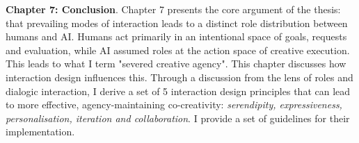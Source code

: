 \textbf{Chapter 7: Conclusion}. Chapter 7 presents the core argument of the thesis: that prevailing modes of interaction leads to a distinct role distribution between humans and AI. Humans act primarily in an intentional space of goals, requests and evaluation, while AI assumed roles at the action space of creative execution. This leads to what I term "severed creative agency". This chapter discusses how interaction design influences this. Through a discussion from the lens of roles and dialogic interaction, I derive a set of 5 interaction design principles that can lead to more effective, agency-maintaining co-creativity: \textit{serendipity, expressiveness, personalisation, iteration and collaboration}. I provide a set of guidelines for their implementation. 


